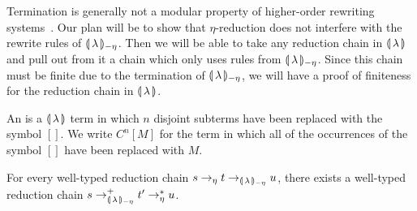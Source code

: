 Termination is generally not a modular property of higher-order rewriting
systems~\cite{appel2010higher}. Our plan will be to show that
$\eta$-reduction does not interfere with the rewrite rules of
${\llparenthesis \, \lambda \, \rrparenthesis_{-\eta}}$. Then we will be able to take any reduction chain in ${\llparenthesis \, \lambda \, \rrparenthesis}$ and
pull out from it a chain which only uses rules from ${\llparenthesis \, \lambda \, \rrparenthesis_{-\eta}}$. Since this
chain must be finite due to the termination of ${\llparenthesis \, \lambda \, \rrparenthesis_{-\eta}}$, we will have a
proof of finiteness for the reduction chain in ${\llparenthesis \, \lambda \, \rrparenthesis}$.

\begin{definition}
  An  is a $\llparenthesis \, \lambda \, \rrparenthesis$ term
  in which $n$ disjoint subterms have been replaced with the symbol
  $[]$. We write $C^n[M]$ for the term in which all of the occurrences of
  the symbol $[]$ have been replaced with $M$.
\end{definition}

\begin{lemma}\label{lem:eta-exchange}

  For every well-typed reduction chain $s \to_\eta t \to_{\llparenthesis \, \lambda \, \rrparenthesis_{-\eta}} u$, there
  exists a well-typed reduction chain $s \to^+_{\llparenthesis \, \lambda \, \rrparenthesis_{-\eta}} t' \to^*_\eta u$.
\end{lemma}

